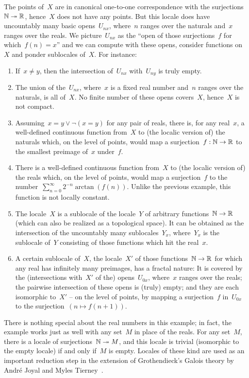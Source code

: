 \documentclass{ws-rv9x6}
\begin{document}
{The points of~$X$ are in canonical one-to-one correspondence with the
surjections~$\mathbb{N} \twoheadrightarrow \mathbb{R}$, hence~$X$ does not have any points.
But this locale does have uncountably many basic opens~$U_{nx}$, where~$n$
ranges over the naturals and~$x$ ranges over the reals. We picture~$U_{nx}$ as
the ``open of those surjections~$f$ for which~$f(n) = x$'' and we can compute with
these opens, consider functions on~$X$ and ponder sublocales of~$X$. For instance:
\begin{enumerate}
\item If~$x \neq y$, then the intersection of~$U_{nx}$ with~$U_{ny}$
is truly empty.
\item The union of the~$U_{nx}$, where~$x$ is a fixed real
number and~$n$ ranges over the naturals, is all of~$X$. No finite number
of these opens covers~$X$, hence~$X$ is not compact.
\item Assuming~$x = y \vee \neg(x = y)$ for any pair of reals, there is, for any real~$x$, a well-defined continuous function from~$X$ to
(the localic version of) the naturals which, on the level of points, would map
a surjection~$f : \mathbb{N} \to \mathbb{R}$ to the smallest preimage of~$x$ under~$f$.
\item There is a well-defined continuous function from~$X$ to (the localic
version of) the reals which, on the level of points, would map a surjection~$f$
to the number~$\sum_{n=0}^\infty 2^{-n} \arctan(f(n))$. Unlike the previous
example, this function is not locally constant.
\item\label{item:intersection-sublocales} The locale~$X$ is a sublocale of the
locale~$Y$ of arbitrary functions~$\mathbb{N} \to \mathbb{R}$ (which can also be realized as
a topological space). It can be obtained as the intersection of the uncountably
many sublocales~$Y_x$, where~$Y_x$ is the sublocale of~$Y$ consisting of those
functions which hit the real~$x$.
\item A certain sublocale of~$X$, the locale~$X'$ of those functions~$\mathbb{N} \to
\mathbb{R}$ for which any real has infinitely many preimages, has a fractal nature: It
is covered by the (intersections with~$X'$ of the) opens~$U_{0x}$, where~$x$ ranges over the reals; the pairwise
intersection of these opens is (truly) empty; and they are each isomorphic
to~$X'$ -- on the level of points, by mapping a surjection~$f$ in~$U_{0x}$ to
the surjection~$(n \mapsto f(n+1))$.
\end{enumerate}

There is nothing special about the real numbers in this example;
in fact, the example works just as well with any set~$M$ in place of the reals.
For any set~$M$, there is a locale of surjections~$\mathbb{N} \twoheadrightarrow M$,
and this locale is trivial (isomorphic to the empty locale) if and only if~$M$
is empty. Locales of these kind are used as an important reduction step in the
extension of Grothendieck's Galois theory by André Joyal and
Myles Tierney~\cite[Section~V.3]{joyal-tierney:galois-theory}.


}
\end{document}
